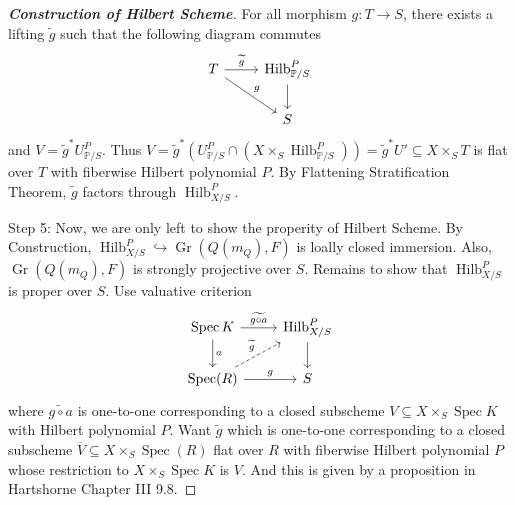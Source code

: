 \documentclass{ctexart}
\newcommand{\spec}{\operatorname{Spec}}
\newcommand{\grassmannianscheme}[2]{\operatorname{Gr}(#1, #2)}
\newcommand{\hilbertscheme}{\operatorname{Hilb}}
\begin{document}
\begin{proof}[\textbf{\emph{Construction of Hilbert Scheme}}]
    For all morphism $g: T \longrightarrow S$, there exists a lifting $\widetilde{g}$ such that the following diagram commutes
    \begin{equation*}
        \begin{tikzcd}
            T \arrow[r, "\widetilde{g}"] \arrow[dr, "g"] &
            \hilbertscheme_{\mathbb{P}/S}^{P} \arrow[d] \\
            & S
        \end{tikzcd}
    \end{equation*}
    and $V = \widetilde{g}^{\ast}U_{\mathbb{P}/S}^{P}$.
    Thus $V = \widetilde{g}^{\ast}(U_{\mathbb{P}/S}^{P} \cap (X \times_{S} \hilbertscheme_{\mathbb{P}/S}^{P})) = \widetilde{g}^{\ast}U' \subseteq X \times_{S} T$ is flat over $T$ with fiberwise Hilbert polynomial $P$.
    By Flattening Stratification Theorem, $\widetilde{g}$ factors through $\hilbertscheme_{X/S}^{P}$.
    \par
    Step 5:
    Now, we are only left to show the properity of Hilbert Scheme.
    By Construction, $\hilbertscheme_{X/S}^{P} \hookrightarrow \grassmannianscheme{Q(m_{Q})}{F}$ is loally closed immersion.
    Also, $\grassmannianscheme{Q(m_{Q})}{F}$ is strongly projective over $S$.
    Remains to show that $\hilbertscheme_{X/S}^{P}$ is proper over $S$.
    Use valuative criterion
    \begin{equation*}
        \begin{tikzcd}
            \spec K \arrow[r, "\widetilde{g \circ a}"] \arrow[d, "a"] &
            \hilbertscheme_{X/S}^{P} \arrow[d] \\
            \spec(R) \arrow[ur, dashrightarrow, "\widetilde{g}"] \arrow[r, "g"] &
            S 
        \end{tikzcd}
    \end{equation*}
    where $\widetilde{g \circ a}$ is one-to-one corresponding to a closed subscheme $V \subseteq X \times_{S} \spec K$ with Hilbert polynomial $P$.
    Want $\widetilde{g}$ which is one-to-one corresponding to a closed subscheme $\overline{V} \subseteq X \times_{S} \spec(R)$ flat over $R$ with fiberwise Hilbert polynomial $P$ whose restriction to $X \times_{S} \spec K$ is $V$.
    And this is given by a proposition in Hartshorne Chapter III 9.8.
\end{proof}
\end{document}

